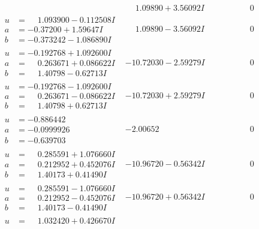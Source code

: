 \documentclass[1p]{elsarticle_modified}
\theoremstyle{definition}
\begin{document}
$$\begin{array}{c|c|c}
 & \phantom{-}1.09890 + 3.56092 I & \phantom{-0.000000 } 0 \\ \hline\begin{aligned}
u &= \phantom{-}1.093900 - 0.112508 I \\
a &= -0.37200 + 1.59647 I \\
b &= -0.373242 - 1.086890 I\end{aligned}
 & \phantom{-}1.09890 - 3.56092 I & \phantom{-0.000000 } 0 \\ \hline\begin{aligned}
u &= -0.192768 + 1.092600 I \\
a &= \phantom{-}0.263671 + 0.086622 I \\
b &= \phantom{-}1.40798 - 0.62713 I\end{aligned}
 & -10.72030 - 2.59279 I & \phantom{-0.000000 } 0 \\ \hline\begin{aligned}
u &= -0.192768 - 1.092600 I \\
a &= \phantom{-}0.263671 - 0.086622 I \\
b &= \phantom{-}1.40798 + 0.62713 I\end{aligned}
 & -10.72030 + 2.59279 I & \phantom{-0.000000 } 0 \\ \hline\begin{aligned}
u &= -0.886442\phantom{ +0.000000I} \\
a &= -0.0999926\phantom{ +0.000000I} \\
b &= -0.639703\phantom{ +0.000000I}\end{aligned}
 & -2.00652\phantom{ +0.000000I} & \phantom{-0.000000 } 0 \\ \hline\begin{aligned}
u &= \phantom{-}0.285591 + 1.076660 I \\
a &= \phantom{-}0.212952 + 0.452076 I \\
b &= \phantom{-}1.40173 + 0.41490 I\end{aligned}
 & -10.96720 - 0.56342 I & \phantom{-0.000000 } 0 \\ \hline\begin{aligned}
u &= \phantom{-}0.285591 - 1.076660 I \\
a &= \phantom{-}0.212952 - 0.452076 I \\
b &= \phantom{-}1.40173 - 0.41490 I\end{aligned}
 & -10.96720 + 0.56342 I & \phantom{-0.000000 } 0 \\ \hline\begin{aligned}
u &= \phantom{-}1.032420 + 0.426670 I \\

\end{aligned}
\end{array}$$
\end{document}
